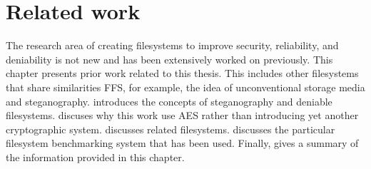 \chapter{Related work}
\label{ch:related_work}
The research area of creating filesystems to improve security, reliability, and deniability is not new and has been extensively worked on previously. This chapter presents prior work related to this thesis. This includes other filesystems that share similarities \gls{FFS}, for example, the idea of unconventional storage media and steganography.  introduces the concepts of steganography and deniable filesystems.  discuses why this work use \gls{AES} rather than introducing yet another cryptographic system.  discusses related filesystems.  discusses the particular filesystem benchmarking system that has been used. Finally,  gives a summary of the information provided in this chapter.











